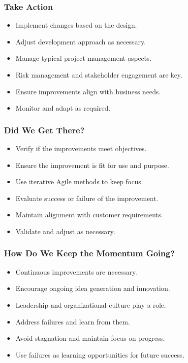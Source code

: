 \documentclass[aspectratio=169, table]{beamer}
\begin{document}
	\begin{frame}
		\frametitle{Take Action}
		\begin{itemize}
			\item Implement changes based on the design.
			\item Adjust development approach as necessary.
			\item Manage typical project management aspects.
			\item Risk management and stakeholder engagement are key.
			\item Ensure improvements align with business needs.
			\item Monitor and adapt as required.
		\end{itemize}
	\end{frame}
	
	\begin{frame}
		\frametitle{Did We Get There?}
		\begin{itemize}
			\item Verify if the improvements meet objectives.
			\item Ensure the improvement is fit for use and purpose.
			\item Use iterative Agile methods to keep focus.
			\item Evaluate success or failure of the improvement.
			\item Maintain alignment with customer requirements.
			\item Validate and adjust as necessary.
		\end{itemize}
	\end{frame}
	
	\begin{frame}
		\frametitle{How Do We Keep the Momentum Going?}
		\begin{itemize}
			\item Continuous improvements are necessary.
			\item Encourage ongoing idea generation and innovation.
			\item Leadership and organizational culture play a role.
			\item Address failures and learn from them.
			\item Avoid stagnation and maintain focus on progress.
			\item Use failures as learning opportunities for future success.
		\end{itemize}
	\end{frame}
	
\end{document}

